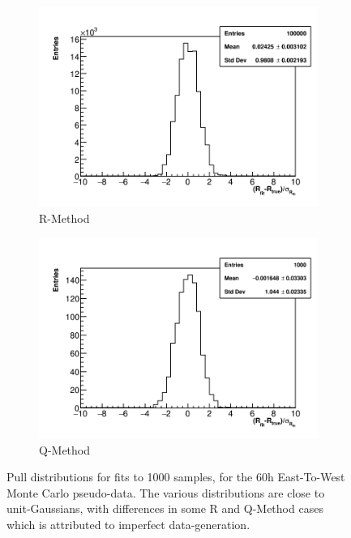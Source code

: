 \begin{figure}
    \begin{subfigure}[t]{0.45\textwidth}
        \centering
        \includegraphics[width=\textwidth]{Rpull_RMethod}
        \caption{R-Method}
    \end{subfigure}
    \hspace{1mm}
    \begin{subfigure}[t]{0.45\textwidth}
        \centering
        \includegraphics[width=\textwidth]{Rpull_QMethod}
        \caption{Q-Method}
    \end{subfigure}
\caption[]{Pull distributions for fits to 1000 samples, for the 60h East-To-West Monte Carlo pseudo-data. The various distributions are close to unit-Gaussians, with differences in some R and Q-Method cases which is attributed to imperfect data-generation.}
\label{fig:pulls}
\end{figure}


